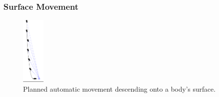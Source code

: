\subsubsection{Surface Movement}\label{subsubsec:surface-movements}

\begin{figure}
    \centering
    \includegraphics[width=0.1\textwidth]{content/4_3_autoNavigation/img/PlannedLanding}
    \caption{Planned automatic movement descending onto a body's surface.}
    \label{fig:new-auto-nav-descend}
\end{figure}

